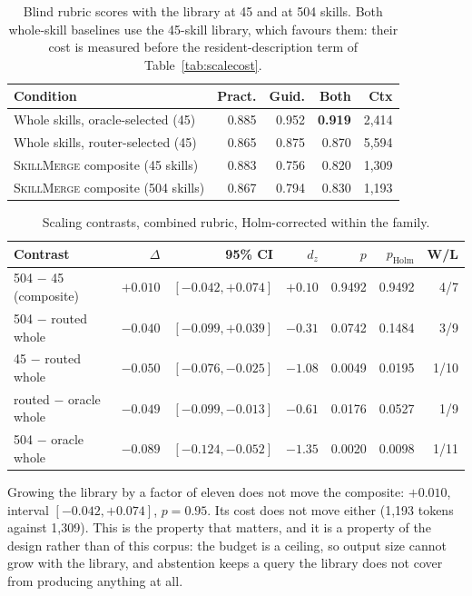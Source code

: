 \documentclass[11pt]{article}
\newcommand{\sm}{\textsc{SkillMerge}}
\begin{document}
\begin{table}[t]\centering\small
\begin{tabular}{lrrrr}
\toprule
Condition & Pract. & Guid. & Both & Ctx \\
\midrule
Whole skills, oracle-selected (45) & 0.885 & 0.952 & \textbf{0.919} & 2{,}414 \\
Whole skills, router-selected (45) & 0.865 & 0.875 & 0.870 & 5{,}594 \\
\sm{} composite (45 skills) & 0.883 & 0.756 & 0.820 & 1{,}309 \\
\sm{} composite (504 skills) & 0.867 & 0.794 & 0.830 & 1{,}193 \\
\bottomrule
\end{tabular}
\caption{Blind rubric scores with the library at 45 and at 504 skills. Both whole-skill baselines
use the 45-skill library, which favours them: their cost is measured before the resident-description
term of Table~\ref{tab:scalecost}.}
\label{tab:scalemain}
\end{table}

\begin{table}[t]\centering\small
\begin{tabular}{lrrrrrr}
\toprule
Contrast & $\Delta$ & 95\% CI & $d_z$ & $p$ & $p_{\text{Holm}}$ & W/L \\
\midrule
504 $-$ 45 (composite) & $+0.010$ & $[-0.042, +0.074]$ & $+0.10$ & 0.9492 & 0.9492 & 4/7 \\
504 $-$ routed whole & $-0.040$ & $[-0.099, +0.039]$ & $-0.31$ & 0.0742 & 0.1484 & 3/9 \\
45 $-$ routed whole & $-0.050$ & $[-0.076, -0.025]$ & $-1.08$ & 0.0049 & 0.0195 & 1/10 \\
routed $-$ oracle whole & $-0.049$ & $[-0.099, -0.013]$ & $-0.61$ & 0.0176 & 0.0527 & 1/9 \\
504 $-$ oracle whole & $-0.089$ & $[-0.124, -0.052]$ & $-1.35$ & 0.0020 & 0.0098 & 1/11 \\
\bottomrule
\end{tabular}
\caption{Scaling contrasts, combined rubric, Holm-corrected within the family.}
\label{tab:scalecontrasts}
\end{table}

Growing the library by a factor of eleven does not move the composite: $+0.010$, interval
$[-0.042, +0.074]$, $p = 0.95$. Its cost does not move either (1,193 tokens against 1,309). This is
the property that matters, and it is a property of the design rather than of this corpus: the budget
is a ceiling, so output size cannot grow with the library, and abstention keeps a query the library
does not cover from producing anything at all.
\end{document}
